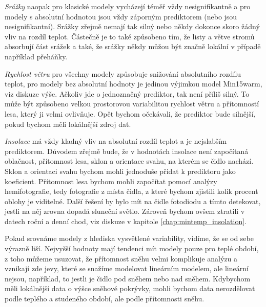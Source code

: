 \textit{Srážky} naopak pro klasické modely vycházejí téměř vždy nesignifikantně a pro modely s absolutní hodnotou jsou vždy záporným prediktorem (nebo jsou nesignifikantní). Srážky zřejmě nemají tak silný nebo někdy dokonce skoro žádný vliv na rozdíl teplot. Částečně je to také způsobeno tím, že listy a větve stromů absorbují část srážek a také, že srážky někdy můžou být značně lokální v případě například přeháňky.

\textit{Rychlost větru} pro všechny modely způsobuje snižování absolutního rozdílu teplot, pro modely bez absolutní hodnoty je jedinou výjimkou model Min15warm, viz diskuze výše. Ačkoliv jde o jednoznačný prediktor, tak není příliš silný. To může být způsobeno velkou prostorovou variabilitou rychlost větru a přítomností lesa, který ji velmi ovlivňuje. Opět bychom očekávali, že prediktor bude silnější, pokud bychom měli lokálnější zdroj dat.

\textit{Insolace} má vždy kladný vliv na absolutní rozdíl teplot a je nejslabším prediktorem. Důvodem zřejmě bude, že v hodnotách insolace není započítaná oblačnost, přítomnost lesa, sklon a orientace svahu, na kterém se čidlo nachází. Sklon a orientaci svahu bychom mohli jednoduše přidat k prediktoru jako koeficient. Přítomnost lesa bychom mohli započítat pomocí analýzy hemifotografie, tedy fotografie z místa čidla, z které bychom zjistili kolik procent oblohy je viditelné. Další řešení by bylo mít na čidle fotodiodu a tímto detekovat, jestli na něj zrovna dopadá sluneční světlo. Zároveň bychom ovšem ztratili v datech roční a denní chod, viz diskuze v kapitole \ref{chap:mintemp_insolation}.

Pokud srovnáme modely z hlediska vysvětlené variability, vidíme, že se od sebe výrazně liší. Nejvyšší hodnoty mají tendenci mít modely pouze pro teplé období, z toho můžeme usuzovat, že přítomnost sněhu velmi komplikuje analýzu a vznikají zde jevy, které se snažíme modelovat lineárním modelem, ale lineární nejsou, například, to jestli je čidlo pod sněhem nebo nad sněhem. Kdybychom měli lokálnější data o výšce sněhové pokrývky, mohli bychom data nerozdělovat podle teplého a studeného období, ale podle přítomnosti sněhu. 

